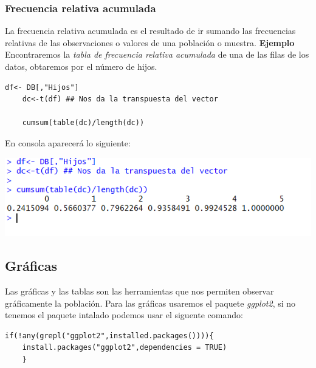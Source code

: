 \documentclass[12pt,hidelinks]{article}
\begin{document}
	\subsubsection{Frecuencia relativa acumulada}
	La frecuencia relativa acumulada es el resultado de ir sumando las frecuencias relativas de las observaciones o valores de una población o muestra. \textbf{Ejemplo} Encontraremos la \textit{tabla de frecuencia relativa acumulada} de una de las filas de los datos, obtaremos por el número de hijos.
	\begin{lstlisting}[frame=single]
	df<- DB[,"Hijos"]
	dc<-t(df) ## Nos da la transpuesta del vector
	
	cumsum(table(dc)/length(dc))
	\end{lstlisting}
	En consola aparecerá lo siguiente:
	\begin{center}
		\includegraphics[width=\linewidth]{images/2/TFrelativaAcum.PNG}
	\end{center}
	\subsection{Gráficas}
	Las gráficas y las tablas son las herramientas que nos permiten observar gráficamente la población. Para las gráficas usaremos el paquete \textit{ggplot2}, si no tenemos el paquete intalado podemos usar el siguente comando:
	\begin{lstlisting}[frame=single]
	if(!any(grepl("ggplot2",installed.packages()))){
	install.packages("ggplot2",dependencies = TRUE)
	}
	\end{lstlisting}
\end{document}
